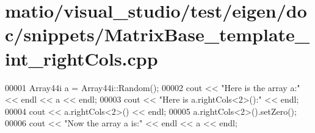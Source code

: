 \hypertarget{matio_2visual__studio_2test_2eigen_2doc_2snippets_2_matrix_base__template__int__right_cols_8cpp_source}{}\section{matio/visual\+\_\+studio/test/eigen/doc/snippets/\+Matrix\+Base\+\_\+template\+\_\+int\+\_\+right\+Cols.cpp}
\label{matio_2visual__studio_2test_2eigen_2doc_2snippets_2_matrix_base__template__int__right_cols_8cpp_source}

\begin{DoxyCode}
00001 Array44i a = Array44i::Random();
00002 cout << \textcolor{stringliteral}{"Here is the array a:"} << endl << a << endl;
00003 cout << \textcolor{stringliteral}{"Here is a.rightCols<2>():"} << endl;
00004 cout << a.rightCols<2>() << endl;
00005 a.rightCols<2>().setZero();
00006 cout << \textcolor{stringliteral}{"Now the array a is:"} << endl << a << endl;
\end{DoxyCode}

